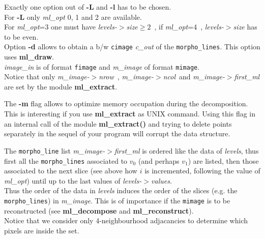 \bigskip

Exactly one option out of {\bf -L} and {\bf -l} has to be chosen.\\
For {\bf -L} only {\em ml\_opt} 0, 1 and 2 are available. \\
For {\em ml\_opt}=3
one must have {\em levels-$>$size}$\geq 2$\, , if {\em ml\_opt}=4 \,,
{\em levels-$>$size} has to be even. \\
Option {\bf -d} allows to obtain a b/w {\tt cimage} {\em c\_out}
of the {\tt morpho\_lines}. This option uses {\bf ml\_draw}. \\
{\em image\_in} is of format {\tt fimage} and {\em m\_image} of format
{\tt mimage}.\\
Notice that only {\em m\_image-$>$nrow}\, ,
{\em m\_image-$>$ncol}\, and {\em m\_image-$>$first\_ml} are set by the
module {\bf ml\_extract}.

The {\bf -m} flag allows to optimize memory occupation during
the decomposition. This is interesting if you use {\bf ml\_extract}
as UNIX command. Using this flag in an internal call
of the module {\bf ml\_extract()} and trying to delete
points separately in the sequel of your program will corrupt
the data structure.

\medskip

The {\tt morpho\_line} list {\em m\_image-$>$first\_ml} is ordered like
the data of {\em levels}, thus first  all the {\tt morpho\_lines}
associated to $v_0$ (and perhaps $v_1$) are listed, then those
associated to the next slice (see above how $i$ is incremented,
following the value of {\em ml\_opt}) until up to the 
last values of {\em levels-$>$values}.\\
Thus the order of the data in {\em levels} induces the order
of the slices (e.g. the {\tt morpho\_lines}) in {\em m\_image}. 
This is of importance if the {\tt mimage} is to be reconstructed
(see {\bf ml\_decompose} and {\bf ml\_reconstruct}).\\
Notice that we consider only 4-neighbourhood adjacancies to determine
which pixels are inside the set.


